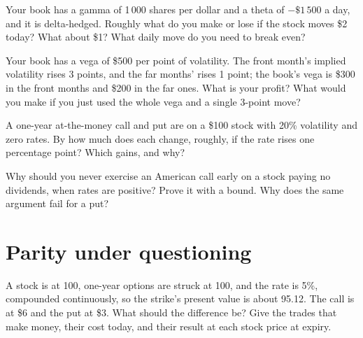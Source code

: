 \begin{question}\label{iq:iv2:options-parity-and-greeks:11}
Your book has a gamma of 1\,000 shares per dollar and a theta of $-\$1\,500$ a day, and it is delta-hedged. Roughly what do you make or lose if the stock moves \$2 today? What about \$1? What daily move do you need to break even?
\end{question}

\begin{question}\label{iq:iv2:options-parity-and-greeks:12}
Your book has a vega of \$500 per point of volatility. The front month's implied volatility rises 3 points, and the far months' rises 1 point; the book's vega is \$300 in the front months and \$200 in the far ones. What is your profit? What would you make if you just used the whole vega and a single 3-point move?
\end{question}

\begin{question}\label{iq:iv2:options-parity-and-greeks:13}
A one-year at-the-money call and put are on a \$100 stock with 20\% volatility and zero rates. By how much does each change, roughly, if the rate rises one percentage point? Which gains, and why?
\end{question}

\begin{question}\label{iq:iv2:options-parity-and-greeks:14}
Why should you never exercise an American call early on a stock paying no dividends, when rates are positive? Prove it with a bound. Why does the same argument fail for a put?
\end{question}

\section{Parity under questioning}

\begin{question}\label{iq:iv2:options-parity-and-greeks:15}
A stock is at 100, one-year options are struck at 100, and the rate is 5\%, compounded continuously, so the strike's present value is about 95.12. The call is at \$6 and the put at \$3. What should the difference be? Give the trades that make money, their cost today, and their result at each stock price at expiry.
\end{question}

